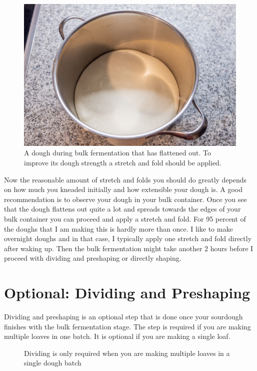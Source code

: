 \begin{figure}[!htb]
  \includegraphics[width=\textwidth]{dough-requiring-stretch-and-fold}
  \caption{A dough during bulk fermentation that has flattened out. To improve
  its dough strength a stretch and fold should be applied.}
\end{figure}

Now the reasonable amount of stretch and folds you should do greatly depends on how much you
kneaded initially and how extensible your dough is. A good recommendation is
to observe your dough in your bulk container. Once you see that the dough
flattens out quite a lot and spreads towards the edges of your bulk container
you can proceed and apply a stretch and fold. For 95 percent of the doughs
that I am making this is hardly more than once. I like to make overnight
doughs and in that case, I typically apply one stretch and fold directly after
waking up. Then the bulk fermentation might take another 2 hours before I
proceed with dividing and preshaping or directly shaping.

\section{Optional: Dividing and Preshaping}

Dividing and preshaping is an optional step that is done
once your sourdough finishes with the bulk fermentation stage.
The step is required if you are making multiple loaves in one
batch. It is optional if you are making a single loaf.

\begin{figure}[!htb]
  \caption{Dividing is only required when you are making multiple loaves in a single dough batch}
  \label{fig:dividing-decision-tree}
\end{figure}

